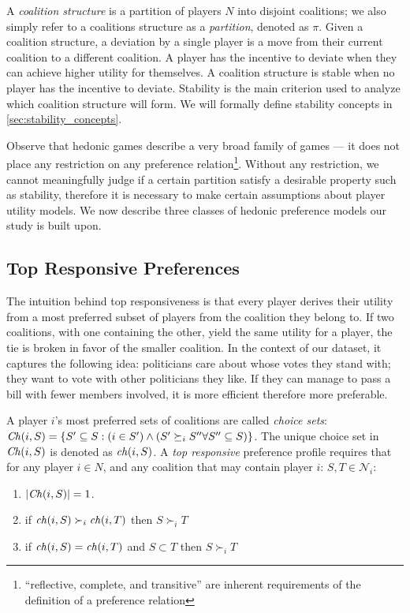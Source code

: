 A \textit{coalition structure} is a partition of players $N$ into disjoint
coalitions;
we also simply refer to a coalitions structure as a \textit{partition},
denoted as $\pi$.
Given a coalition structure, a deviation by a single player is a
move from their current coalition to a different coalition.
A player has the incentive to deviate when they can achieve higher utility for
themselves.
A coalition structure is stable when no player has the incentive to deviate.
Stability is the main criterion used to analyze which coalition structure will
form.
We will formally define stability concepts in \autoref{sec:stability_concepts}.

Observe that hedonic games describe a very broad family of games --- it does not
place any restriction on any preference relation\footnote{``reflective, complete,
and transitive'' are inherent requirements of the definition of a preference
relation}.
Without any restriction, we cannot meaningfully judge if a certain partition
satisfy a desirable property such as stability, therefore it is necessary to make
certain assumptions about player utility models.
We now describe three classes of hedonic preference models our study is built upon.

\subsection{Top Responsive Preferences}
\label{subsec:top_responsive_preferences}
The intuition behind top responsiveness is that every player derives their
utility from a most preferred subset of players from the coalition they belong to.
If two coalitions, with one containing the other, yield the same utility for
a player, the tie is broken in favor of the smaller coalition.
In the context of our dataset, it captures the following idea:
politicians care about whose votes they stand with;
they want to vote with other politicians they like.
If they can manage to pass a bill with fewer members involved,
it is more efficient therefore more preferable.

A player $i$'s most preferred sets of coalitions are called \textit{choice sets}:
$\mathit{Ch}(i, S) = \{S' \subseteq S: (i \in S') \wedge (S' \succeq_i S'' \forall S'' \subseteq S)\}$.
The unique choice set in $\mathit{Ch}(i, S)$ is denoted as $\mathit{ch}(i, S)$.
A {\em top responsive} preference profile requires that for any player $i \in N$,
and any coalition that may contain player $i$: $S, T \in \mathcal{N}_i$:
\begin{enumerate}
  \item $|\mathit{Ch}(i, S)| = 1$.
  \item if $\mathit{ch}(i, S) \succ_i \mathit{ch}(i, T)$ then $S \succ_i T$
  \item if $\mathit{ch}(i, S) = \mathit{ch}(i, T)$ and $S \subset T$ then $S \succ_i T$
\end{enumerate}

